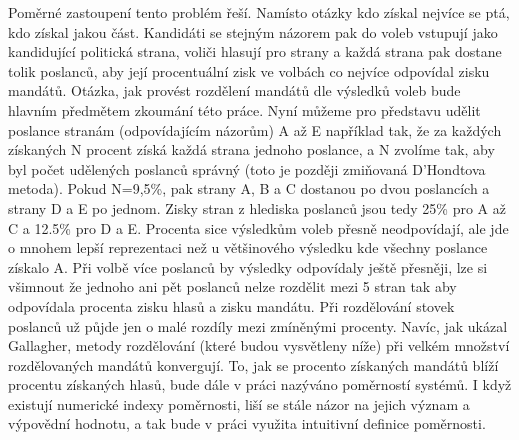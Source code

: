 \documentclass[12pt]{report}
\begin{document}
Poměrné zastoupení tento problém řeší.
Namísto otázky kdo získal nejvíce se ptá, kdo získal jakou část.
Kandidáti se stejným názorem pak do voleb vstupují jako kandidující politická strana, voliči hlasují pro strany a každá strana pak dostane tolik poslanců, aby její procentuální zisk ve volbách co nejvíce odpovídal zisku mandátů.
Otázka, jak provést rozdělení mandátů dle výsledků voleb bude hlavním předmětem zkoumání této práce.
Nyní můžeme pro představu udělit poslance stranám (odpovídajícím názorům) A až E například tak, že za každých získaných N procent získá každá strana jednoho poslance, a N zvolíme tak, aby byl počet udělených poslanců správný (toto je později zmiňovaná D'Hondtova metoda).
Pokud N=9,5\%, pak strany A, B a C dostanou po dvou poslancích a strany D a E po jednom.
Zisky stran z hlediska poslanců jsou tedy 25\% pro A až C a 12.5\% pro D a E.
Procenta sice výsledkům voleb přesně neodpovídají, ale jde o mnohem lepší reprezentaci než u většinového výsledku kde všechny poslance získalo A.
Při volbě více poslanců by výsledky odpovídaly ještě přesněji, lze si všimnout že jednoho ani pět poslanců nelze  rozdělit mezi 5 stran tak aby odpovídala procenta zisku hlasů a zisku mandátu.
Při rozdělování stovek poslanců už půjde jen o malé rozdíly mezi zmíněnými procenty.
Navíc, jak ukázal Gallagher, metody rozdělování (které budou vysvětleny níže) při velkém množství rozdělovaných mandátů konvergují.\autocite{GAL1} To, jak se procento získaných mandátů blíží procentu získaných hlasů, bude dále v práci nazýváno poměrností systémů.
I když existují numerické indexy poměrnosti, liší se stále názor na jejich význam a výpovědní hodnotu, a tak bude v práci využita intuitivní definice poměrnosti.\autocite{GAL2}
\end{document}
